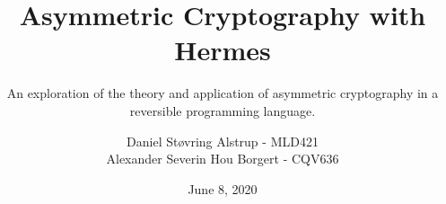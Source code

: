 \documentclass[a4paper,11pt,oneside]{memoir}
\begin{document}

\thesiscomment{} %
\title{Asymmetric Cryptography with Hermes}
\subtitle{An exploration of the theory and application of asymmetric cryptography in a reversible programming language.} %
\author{%
  Daniel Støvring Alstrup - MLD421\\[4pt]
  Alexander Severin Hou Borgert - CQV636}
\date{June 8, 2020} %

\pagestyle{plain}
\maketitle

\cleardoublepage
{}
\setcounter{page}{3}
\end{document}
